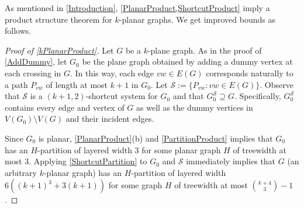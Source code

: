 \documentclass{patmorin}
\theoremstyle{plain}
\newtheorem{thm}{Theorem}
\theoremstyle{definition}
\DeclareMathOperator{\tw}{tw}
\renewcommand{\SS}{\mathcal{S}}
\renewcommand{\leq}{\leqslant}
\newcommand{\R}{\mathbb{R}}
\begin{document}
As mentioned in \cref{Introduction}, \cref{PlanarProduct,ShortcutProduct} imply a product structure theorem for $k$-planar graphs. We get improved bounds as follows.


\begin{proof}[Proof of \cref{kPlanarProduct}]
	Let $G$ be a $k$-plane graph.
	As in the proof of \cref{AddDummy}, let $G_0$ be the plane graph obtained by adding a dummy vertex at each crossing in $G$. In this way, each edge $vw\in E(G)$ corresponds naturally to a path $P_{vw}$ of length at most $k+1$ in $G_0$.  Let $\SS := \{P_{vw}: vw\in E(G)\}$. Observe that $\SS$ is a $(k+1,2)$-shortcut system for $G_0$ and that $G_0^{\SS}\supseteq G$.  Specifically, $G_0^{\SS}$ contains every edge and vertex of $G$ as well as the dummy vertices in $V(G_0)\setminus V(G)$ and their incident edges.

	Since $G_0$ is planar,  \cref{PlanarProduct}(b) and \cref{PartitionProduct} implies that $G_0$ has an $H$-partition of layered width 3 for some planar graph $H$ of treewidth at most 3.  Applying \cref{ShortcutPartition} to $G_0$ and $\SS$ immediately implies that $G$ (an arbitrary $k$-planar graph) has an $H$-partition of layered width $6((k+1)^3+3(k+1))$ for some graph $H$ of treewidth at most $\binom{k+4}{3}-1$.


\end{proof}
\end{document}
